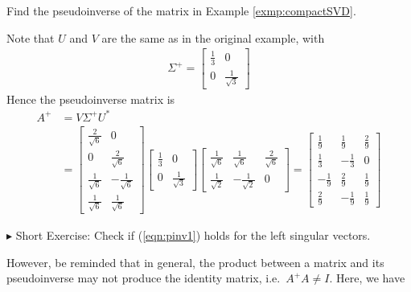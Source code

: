 \begin{exmp}
\label{exmp:compactpinv}
Find the pseudoinverse of the matrix in Example \ref{exmp:compactSVD}.
\end{exmp}
\begin{solution}
Note that $U$ and $V$ are the same as in the original example, with
\begin{align*}
\Sigma^+ = 
\begin{bmatrix}
\frac{1}{3} & 0 \\
0 & \frac{1}{\sqrt{3}}
\end{bmatrix}
\end{align*}
Hence the pseudoinverse matrix is
\begin{align*}
A^+ &= V\Sigma^+ U^* \\
&=
\begin{bmatrix}
\frac{2}{\sqrt{6}} & 0 \\
0 & \frac{2}{\sqrt{6}} \\
\frac{1}{\sqrt{6}} & -\frac{1}{\sqrt{6}}\\
\frac{1}{\sqrt{6}} & \frac{1}{\sqrt{6}}   
\end{bmatrix}
\begin{bmatrix}
\frac{1}{3} & 0 \\
0 & \frac{1}{\sqrt{3}}
\end{bmatrix}
\begin{bmatrix}
\frac{1}{\sqrt{6}} & \frac{1}{\sqrt{6}} & \frac{2}{\sqrt{6}} \\  
\frac{1}{\sqrt{2}} & -\frac{1}{\sqrt{2}} & 0
\end{bmatrix} =
\begin{bmatrix}
\frac{1}{9}&\frac{1}{9}&\frac{2}{9}\\ 
\frac{1}{3}&-\frac{1}{3}&0\\ 
-\frac{1}{9}&\frac{2}{9}&\frac{1}{9}\\ 
\frac{2}{9}&-\frac{1}{9}&\frac{1}{9}
\end{bmatrix}
\end{align*}
\end{solution}
$\blacktriangleright$ Short Exercise: Check if (\ref{eqn:pinv1}) holds for the left singular vectors.\footnotemark\par
However, be reminded that in general, the product between a matrix and its pseudoinverse may not produce the identity matrix, i.e.\ $A^+ A \neq I$. Here, we have
